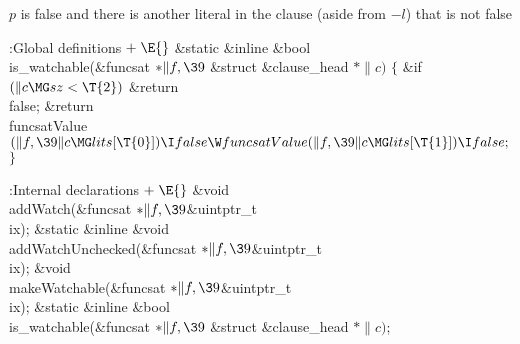 \li $p$ is false and there is another literal in the clause (aside from $-l$)
that is not false

\endnumberedlist
\Y\B\4:Global definitions\X${}\mathrel+\E{}$\6
\&{static} \&{inline} \&{bool} \\{is\_watchable}(\&{funcsat} ${}{*}\|f,\39{}$%
\&{struct} \&{clause\_head} ${}{*}\|c){}$\1\1\2\2\6
${}\{{}$\1\6
\&{if} ${}(\|c\MG\\{sz}<\T{2}){}$\1\5
\&{return} \\{false};\2\6
\&{return} \\{funcsatValue}${}(\|f,\39\|c\MG\\{lits}[\T{0}])\I\\{false}\W%
\\{funcsatValue}(\|f,\39\|c\MG\\{lits}[\T{1}])\I\\{false};{}$\6
\4${}\}{}$\2\par
\fi


\Y\B\4:Internal declarations\X${}\mathrel+\E{}$\6
\&{void} \\{addWatch}(\&{funcsat} ${}{*}\|f,\39{}$\&{uintptr\_t} \\{ix});\6
\&{static} \&{inline} \&{void} \\{addWatchUnchecked}(\&{funcsat} ${}{*}\|f,%
\39{}$\&{uintptr\_t} \\{ix});\6
\&{void} \\{makeWatchable}(\&{funcsat} ${}{*}\|f,\39{}$\&{uintptr\_t} \\{ix});\6
\&{static} \&{inline} \&{bool} \\{is\_watchable}(\&{funcsat} ${}{*}\|f,\39{}$%
\&{struct} \&{clause\_head} ${}{*}\|c){}$;\par
\fi



